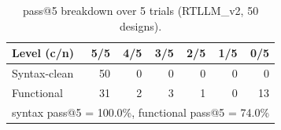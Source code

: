 \begin{table}[t]
\centering
\caption{pass@5 breakdown over 5 trials (RTLLM_v2, 50 designs).}
\label{tab:pass5_breakdown_rtllm_v2}
\begin{tabular}{lrrrrrr}
\toprule
Level (c/n) & 5/5 & 4/5 & 3/5 & 2/5 & 1/5 & 0/5 \\
\midrule
Syntax-clean & 50 & 0 & 0 & 0 & 0 & 0 \\
Functional & 31 & 2 & 3 & 1 & 0 & 13 \\
\midrule
\multicolumn{7}{l}{syntax pass@5 = 100.0\%, functional pass@5 = 74.0\%} \\
\bottomrule
\end{tabular}
\end{table}
